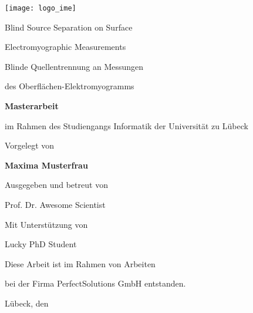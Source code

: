 \begin{titlepage}

  \texttt{[image: logo\_ime]}

  \vspace{0.8cm}


    \LARGE
    Blind Source Separation on Surface

    Electromyographic Measurements

    \vspace{1cm}

    \Large

    Blinde Quellentrennung an Messungen 

    des Oberflächen-Elektromyogramms

    \vspace{0.8cm}

    \large

    \textbf{Masterarbeit} 

    im Rahmen des Studiengangs Informatik der Universität zu Lübeck

    \vspace{0.8cm}
    
    Vorgelegt von

    \textbf{Maxima Musterfrau}

    \vspace{0.8cm}

    Ausgegeben und betreut von

    Prof. Dr. Awesome Scientist

    \vspace{0.8cm}

    Mit Unterstützung von

    Lucky PhD Student

    \vspace{0.8cm}

    Diese Arbeit ist im Rahmen von Arbeiten 

    bei der Firma PerfectSolutions GmbH entstanden.
    
    \vspace{1.3cm}

    Lübeck, den \submitdate


\end{titlepage}

